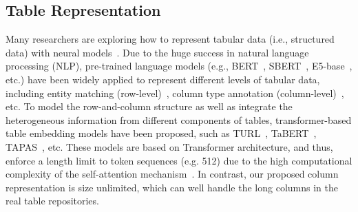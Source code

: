 
\subsection{Table Representation}
Many researchers are exploring how to represent tabular data (i.e., structured data) with neural models~\cite{tableembed, badaro2023transformers}. Due to the huge success in natural language processing (NLP), pre-trained language models (e.g., BERT~\cite{bert}, SBERT~\cite{sentencebert}, E5-base~\cite{E5-Base-4k}, etc.) have been widely applied to represent different levels of tabular data, including entity matching (row-level)~\cite{camper,ditto}, column type annotation (column-level)~\cite{doduo,Watchog}, etc. To model the row-and-column structure as well as integrate the heterogeneous information from different components of tables, transformer-based table embedding models have been proposed, such as TURL~\cite{turl}, TaBERT~\cite{tabert}, TAPAS~\cite{tapas}, etc. These models are based on Transformer architecture, and thus, enforce a length limit to token sequences (e.g. 512) due to the high computational complexity of the self-attention mechanism~\cite{attention}. In contrast, our proposed column representation is size unlimited, which can well handle the long columns in the real table repositories.

